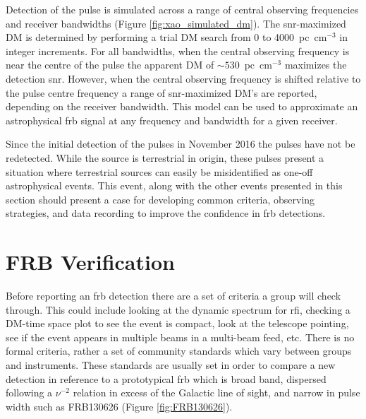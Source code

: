 \documentclass[a4paper,fleqn,usenatbib]{mnras}
\begin{document}
Detection of the pulse is simulated across a range of central observing
frequencies and receiver bandwidths (Figure \ref{fig:xao_simulated_dm}). The
\gls{snr}-maximized DM is determined by performing a trial DM search from 0 to
4000~pc~cm$^{-3}$ in integer increments.  For all bandwidths, when the central
observing frequency is near the centre of the pulse the apparent DM of
$\sim530$~pc~cm$^{-3}$ maximizes the detection \gls{snr}. However, when the
central observing frequency is shifted relative to the pulse centre frequency a
range of \gls{snr}-maximized DM's are reported, depending on the receiver
bandwidth. This model can be used to approximate an astrophysical \gls{frb}
signal at any frequency and bandwidth for a given receiver.

Since the initial detection of the pulses in November 2016 the pulses have not
be redetected. While the source is terrestrial in origin, these pulses present a
situation where terrestrial sources can easily be misidentified as one-off
astrophysical events. This event, along with the other events presented in this
section should present a case for developing common criteria, observing
strategies, and data recording to improve the confidence in \gls{frb}
detections.

\section{FRB Verification}
\label{sec:verify_crit}

Before reporting an \gls{frb} detection there are a set of criteria a group will
check through. This could include looking at the dynamic spectrum for \gls{rfi},
checking a DM-time space plot to see the event is compact, look at the telescope
pointing, see if the event appears in multiple beams in a multi-beam feed, etc.
There is no formal criteria, rather a set of community standards which vary
between groups and instruments. These standards are usually set in order to
compare a new detection in reference to a prototypical \gls{frb} which is broad
band, dispersed following a $\nu^{-2}$ relation in excess of the Galactic line
of sight, and narrow in pulse width such as FRB130626
\citep{2016MNRAS.460L..30C} (Figure \ref{fig:FRB130626}).
\end{document}
